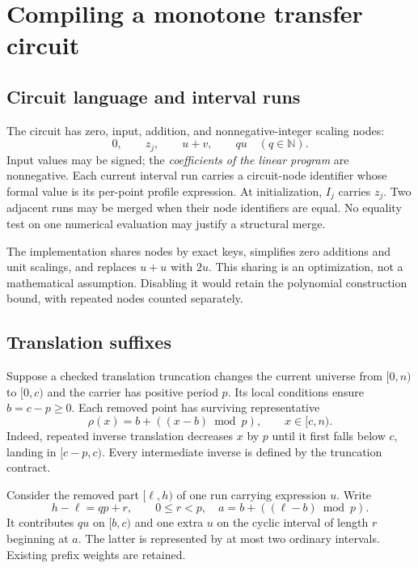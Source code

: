 \documentclass[11pt]{article}
\theoremstyle{definition}\newtheorem{definition}[theorem]{Definition}
\theoremstyle{remark}\newtheorem{remark}[theorem]{Remark}
\newcommand{\N}{\mathbb N}
\begin{document}
\section{Compiling a monotone transfer circuit}
\label{sec:compiler}

\subsection{Circuit language and interval runs}
The circuit has zero, input, addition, and nonnegative-integer scaling nodes:
\[
 0,\qquad z_j,\qquad u+v,\qquad q u\quad(q\in\N).
\]
Input values may be signed; the \emph{coefficients of the linear program} are
nonnegative. Each current interval run carries a circuit-node identifier whose
formal value is its per-point profile expression. At initialization, $I_j$
carries $z_j$. Two adjacent runs may be merged when their node identifiers are
equal. No equality test on one numerical evaluation may justify a structural
merge.

The implementation shares nodes by exact keys, simplifies zero additions and
unit scalings, and replaces $u+u$ with $2u$. This sharing is an optimization, not
a mathematical assumption. Disabling it would retain the polynomial construction
bound, with repeated nodes counted separately.

\subsection{Translation suffixes}
Suppose a checked translation truncation changes the current universe from
$[0,n)$ to $[0,c)$ and the carrier has positive period $p$. Its local conditions
ensure $b=c-p\ge0$. Each removed point has surviving representative
\begin{equation}
 \rho(x)=b+((x-b)\bmod p),\qquad x\in[c,n).
 \label{eq:fold}
\end{equation}
Indeed, repeated inverse translation decreases $x$ by $p$ until it first falls
below $c$, landing in $[c-p,c)$. Every intermediate inverse is defined by the
truncation contract.

Consider the removed part $[\ell,h)$ of one run carrying expression $u$. Write
\[
 h-\ell=qp+r,\qquad 0\le r<p,
 \quad a=b+((\ell-b)\bmod p).
\]
It contributes $qu$ on $[b,c)$ and one extra $u$ on the cyclic interval of
length $r$ beginning at $a$. The latter is represented by at most two ordinary
intervals. Existing prefix weights are retained.
\end{document}
